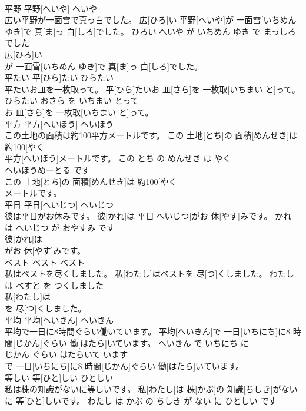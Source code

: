 \documentclass[8pt]{extreport}
\begin{document}
\begin{CJK}{UTF8}{min}
\\	平野	平野[へいや]	へいや	
\\	広い平野が一面雪で真っ白でした。	広[ひろ]い 平野[へいや]が 一面雪[いちめん ゆき]で 真[ま]っ 白[しろ]でした。	ひろい へいや が いちめん ゆき で まっしろ でした	
\\	広[ひろ]い
\\	が 一面雪[いちめん ゆき]で 真[ま]っ 白[しろ]でした。			
\\	平たい	平[ひら]たい	ひらたい	
\\	平たいお皿を一枚取って。	平[ひら]たいお 皿[さら]を 一枚取[いちまい と]って。	ひらたい おさら を いちまい とって	
\\	お 皿[さら]を 一枚取[いちまい と]って。			
\\	平方	平方[へいほう]	へいほう	
\\	この土地の面積は約100平方メートルです。	この 土地[とち]の 面積[めんせき]は 約100[やく 
\\	平方[へいほう]メートルです。	この とち の めんせき は やく 
\\	へいほうめーとる です	
\\	この 土地[とち]の 面積[めんせき]は 約100[やく 
\\	メートルです。			
\\	平日	平日[へいじつ]	へいじつ	
\\	彼は平日がお休みです。	彼[かれ]は 平日[へいじつ]がお 休[やす]みです。	かれ は へいじつ が おやすみ です	
\\	彼[かれ]は
\\	がお 休[やす]みです。			
\\	ベスト	ベスト	ベスト	
\\	私はベストを尽くしました。	私[わたし]はベストを 尽[つ]くしました。	わたし は べすと を つくしました	
\\	私[わたし]は
\\	を 尽[つ]くしました。			
\\	平均	平均[へいきん]	へいきん	
\\	平均で一日に8時間ぐらい働いています。	平均[へいきん]で 一日[いちにち]に8 時間[じかん]ぐらい 働[はたら]いています。	へいきん で いちにち に 
\\	じかん ぐらい はたらいて います	
\\	で 一日[いちにち]に8 時間[じかん]ぐらい 働[はたら]いています。			
\\	等しい	等[ひと]しい	ひとしい	
\\	私は株の知識がないに等しいです。	私[わたし]は 株[かぶ]の 知識[ちしき]がないに 等[ひと]しいです。	わたし は かぶ の ちしき が ない に ひとしい です	

\end{CJK}
\end{document}
